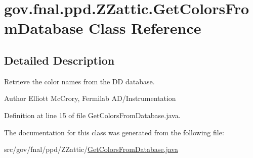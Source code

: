 \hypertarget{classgov_1_1fnal_1_1ppd_1_1ZZattic_1_1GetColorsFromDatabase}{\section{gov.\-fnal.\-ppd.\-Z\-Zattic.\-Get\-Colors\-From\-Database Class Reference}
\label{classgov_1_1fnal_1_1ppd_1_1ZZattic_1_1GetColorsFromDatabase}
}


\subsection{Detailed Description}
Retrieve the color names from the D\-D database.

\begin{DoxyAuthor}{Author}
Elliott Mc\-Crory, Fermilab A\-D/\-Instrumentation 
\end{DoxyAuthor}


Definition at line 15 of file Get\-Colors\-From\-Database.\-java.



The documentation for this class was generated from the following file\-:\begin{DoxyCompactItemize}
\item 
src/gov/fnal/ppd/\-Z\-Zattic/\hyperlink{GetColorsFromDatabase_8java}{Get\-Colors\-From\-Database.\-java}\end{DoxyCompactItemize}
